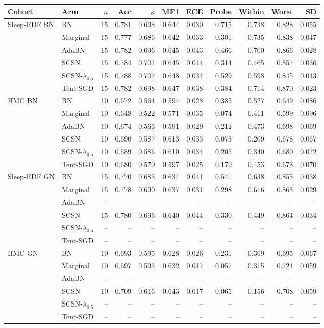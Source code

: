 \begin{tabular}{llrrrrrrrrr}
\toprule
Cohort & Arm & $n$ & Acc & $\kappa$ & MF1 & ECE & Probe & Within & Worst & SD \\
\midrule
Sleep-EDF BN & BN & 15 & 0.781 & 0.698 & 0.644 & 0.030 & 0.715 & 0.738 & 0.828 & 0.055 \\
 & Marginal & 15 & 0.777 & 0.686 & 0.642 & 0.033 & 0.301 & 0.735 & 0.838 & 0.047 \\
 & AdaBN & 15 & 0.782 & 0.696 & 0.645 & 0.043 & 0.466 & 0.700 & 0.866 & 0.028 \\
 & SCSN & 15 & 0.784 & 0.701 & 0.645 & 0.044 & 0.314 & 0.465 & 0.857 & 0.036 \\
 & SCSN-$\lambda_{0.5}$ & 15 & 0.788 & 0.707 & 0.648 & 0.034 & 0.529 & 0.598 & 0.845 & 0.043 \\
 & Tent-SGD & 15 & 0.782 & 0.698 & 0.647 & 0.038 & 0.384 & 0.714 & 0.870 & 0.023 \\
\addlinespace
HMC BN & BN & 10 & 0.672 & 0.564 & 0.594 & 0.028 & 0.385 & 0.527 & 0.649 & 0.086 \\
 & Marginal & 10 & 0.648 & 0.522 & 0.571 & 0.035 & 0.074 & 0.411 & 0.599 & 0.096 \\
 & AdaBN & 10 & 0.674 & 0.563 & 0.591 & 0.029 & 0.212 & 0.473 & 0.698 & 0.069 \\
 & SCSN & 10 & 0.690 & 0.587 & 0.613 & 0.033 & 0.073 & 0.209 & 0.678 & 0.067 \\
 & SCSN-$\lambda_{0.5}$ & 10 & 0.689 & 0.586 & 0.610 & 0.034 & 0.205 & 0.340 & 0.680 & 0.072 \\
 & Tent-SGD & 10 & 0.680 & 0.570 & 0.597 & 0.025 & 0.179 & 0.453 & 0.673 & 0.070 \\
\addlinespace
Sleep-EDF GN & BN & 15 & 0.770 & 0.683 & 0.634 & 0.041 & 0.541 & 0.638 & 0.855 & 0.038 \\
 & Marginal & 15 & 0.778 & 0.690 & 0.637 & 0.031 & 0.298 & 0.616 & 0.863 & 0.029 \\
 & AdaBN & -- & -- & -- & -- & -- & -- & -- & -- & -- \\
 & SCSN & 15 & 0.780 & 0.696 & 0.640 & 0.044 & 0.330 & 0.449 & 0.864 & 0.034 \\
 & SCSN-$\lambda_{0.5}$ & -- & -- & -- & -- & -- & -- & -- & -- & -- \\
 & Tent-SGD & -- & -- & -- & -- & -- & -- & -- & -- & -- \\
\addlinespace
HMC GN & BN & 10 & 0.693 & 0.595 & 0.628 & 0.026 & 0.231 & 0.369 & 0.695 & 0.067 \\
 & Marginal & 10 & 0.697 & 0.593 & 0.632 & 0.017 & 0.057 & 0.315 & 0.724 & 0.059 \\
 & AdaBN & -- & -- & -- & -- & -- & -- & -- & -- & -- \\
 & SCSN & 10 & 0.709 & 0.616 & 0.643 & 0.017 & 0.065 & 0.156 & 0.708 & 0.059 \\
 & SCSN-$\lambda_{0.5}$ & -- & -- & -- & -- & -- & -- & -- & -- & -- \\
 & Tent-SGD & -- & -- & -- & -- & -- & -- & -- & -- & -- \\
\bottomrule
\end{tabular}
